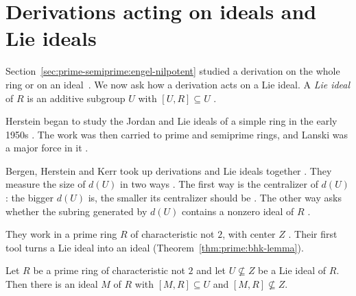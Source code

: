 \section{Derivations acting on ideals and Lie ideals}\label{sec:prime-semiprime:ideals-lie-ideals}

Section~\ref{sec:prime-semiprime:engel-nilpotent} studied a derivation on the
whole ring or on an ideal~\cite[p.~280]{Lanski1988}. We now ask how a derivation acts on a Lie ideal. A
\emph{Lie ideal} of $R$ is an additive subgroup $U$ with $[U,R]\subseteq U$
\cite[p.~280]{Lanski1988}.

Herstein began to study the Jordan and Lie ideals of a simple ring in the
early 1950s \cite[p.~14]{MartindaleMiers1986}. The work was then carried to
prime and semiprime rings, and Lanski was a major force in it
\cite[p.~14]{MartindaleMiers1986}.

Bergen, Herstein and Kerr took up derivations and Lie ideals together
\cite[p.~259]{BergenHersteinKerr1981}. They measure the size of $d(U)$ in two
ways \cite[p.~259]{BergenHersteinKerr1981}. The first way is the centralizer
of $d(U)$: the bigger $d(U)$ is, the smaller its centralizer should be
\cite[p.~259]{BergenHersteinKerr1981}. The other way asks whether the subring
generated by $d(U)$ contains a nonzero ideal of $R$
\cite[p.~259]{BergenHersteinKerr1981}.

They work in a prime ring $R$ of characteristic not $2$, with center $Z$
\cite[p.~260]{BergenHersteinKerr1981}. Their first tool turns a Lie ideal into
an ideal (Theorem~\ref{thm:prime:bhk-lemma}).

\begin{theorem}\label{thm:prime:bhk-lemma}
Let $R$ be a prime ring of characteristic not $2$ and let $U\not\subseteq Z$ be a
Lie ideal of $R$. Then there is an ideal $M$ of $R$ with $[M,R]\subseteq U$ and
$[M,R]\not\subseteq Z$.
\end{theorem}


